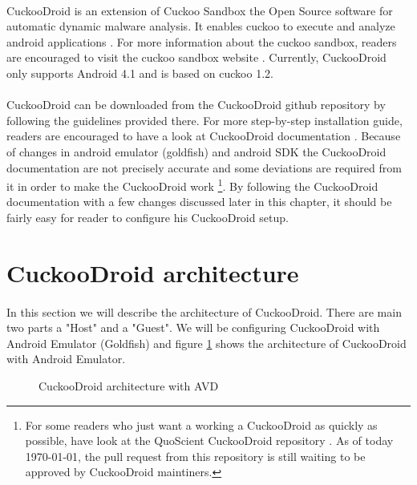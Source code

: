 \documentclass[../main.tex]{subfile}
\begin{document}
		
		\paragraph{} CuckooDroid is an extension of Cuckoo Sandbox the Open Source software for automatic dynamic malware analysis. It enables cuckoo to execute and analyze android applications \cite{cuckoodroid_docs}. For more information about the cuckoo sandbox, readers are encouraged to visit the cuckoo sandbox website \cite{cuckoo_website}. Currently, CuckooDroid only supports Android 4.1 and is based on cuckoo 1.2.
		
		\paragraph{} CuckooDroid can be downloaded from the CuckooDroid github repository \cite{cuckoodroid_github} by following the guidelines provided there. For more step-by-step installation guide, readers are encouraged to have a look at CuckooDroid documentation \cite{cuckoodroid_docs}. Because of changes in android emulator (goldfish) and android SDK the CuckooDroid documentation are not precisely accurate and some deviations are required from it in order to make the CuckooDroid work \footnote{For some readers who just want a working a CuckooDroid as quickly as possible, have look at the QuoScient CuckooDroid repository \cite{cuckoodroid_quoscient}. As of today \today, the pull request from this repository is still waiting to be approved by CuckooDroid maintiners.}. By following the CuckooDroid documentation with a few changes discussed later in this chapter, it should be fairly easy for reader to configure his CuckooDroid setup.

		
		\section{CuckooDroid architecture}
		\paragraph{} In this section we will describe the architecture of CuckooDroid. There are main two parts a "Host" and a "Guest". We will be configuring CuckooDroid with Android Emulator (Goldfish) and figure \ref{fig:cuckoodroid_avd_arch} shows the architecture of CuckooDroid with Android Emulator.
		
		\begin{figure}[H]
			\centering
			\caption{CuckooDroid architecture with AVD}
			\label{fig:cuckoodroid_avd_arch}
		\end{figure}
		
\end{document}

